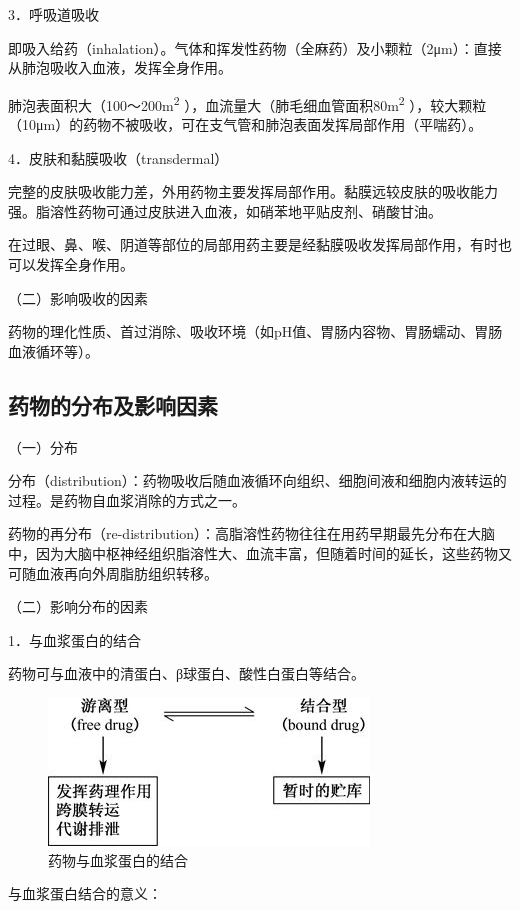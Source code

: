 3．呼吸道吸收

即吸入给药（inhalation）。气体和挥发性药物（全麻药）及小颗粒（2μm）：直接从肺泡吸收入血液，发挥全身作用。

肺泡表面积大（100～200m\textsuperscript{2}
），血流量大（肺毛细血管面积80m\textsuperscript{2}
），较大颗粒（10μm）的药物不被吸收，可在支气管和肺泡表面发挥局部作用（平喘药）。

4．皮肤和黏膜吸收（transdermal）

完整的皮肤吸收能力差，外用药物主要发挥局部作用。黏膜远较皮肤的吸收能力强。脂溶性药物可通过皮肤进入血液，如硝苯地平贴皮剂、硝酸甘油。

在过眼、鼻、喉、阴道等部位的局部用药主要是经黏膜吸收发挥局部作用，有时也可以发挥全身作用。

（二）影响吸收的因素

药物的理化性质、首过消除、吸收环境（如pH值、胃肠内容物、胃肠蠕动、胃肠血液循环等）。

\subsection{药物的分布及影响因素}

（一）分布

分布（distribution）：药物吸收后随血液循环向组织、细胞间液和细胞内液转运的过程。是药物自血浆消除的方式之一。

药物的再分布（re-distribution）：高脂溶性药物往往在用药早期最先分布在大脑中，因为大脑中枢神经组织脂溶性大、血流丰富，但随着时间的延长，这些药物又可随血液再向外周脂肪组织转移。

（二）影响分布的因素

1．与血浆蛋白的结合

药物可与血液中的清蛋白、β球蛋白、酸性白蛋白等结合。

\begin{figure}[!htbp]
 \centering
 \includegraphics{./images/Image00035.jpg}
 \captionsetup{justification=centering}
 \caption{药物与血浆蛋白的结合}
 \label{fig3-8}
  \end{figure} 

与血浆蛋白结合的意义：

